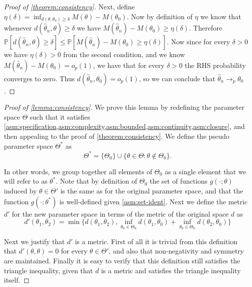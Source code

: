\documentclass{article}
\theoremstyle{plain}
\theoremstyle{definition}
\begin{document}
\begin{proof}[Proof of \cref{theorem:consistency}]
Next, define $\eta(\delta) = \inf_{d(\theta,\theta_0) \geq \delta} M(\theta) - M(\theta_0)$. Now by definition of $\eta$ we know that whenever $d(\hat \theta_n, \theta) \geq \delta$ we have $M(\hat \theta_n) - M(\theta_0) \geq \eta(\delta)$.  Therefore $\mathbb P[d(\hat \theta_n, \theta) \geq \delta] \leq \mathbb P[M(\hat \theta_n) - M(\theta_0) \geq \eta(\delta)]$. Now since for every $\delta > 0$ we have $\eta(\delta) > 0$ from the second condition, and we know $M(\hat \theta_n) - M(\theta_0) = o_p(1)$, we have that for every $\delta > 0$ the RHS probability converges to zero. Thus $d(\hat \theta_n, \theta_0) = o_p(1)$, so we can conclude that $\hat\theta_n \rightarrow_p \theta_0$.
%
%
\end{proof}


\begin{proof}[Proof of \cref{lemma:consistency}]

We prove this lemma by redefining the parameter space $\Theta$ such that it satisfies \cref{asm:specification,asm:complexity,asm:bounded,asm:continuity,asm:closure}, and then appealing to the proof of \cref{theorem:consistency}. We define the pseudo parameter space $\Theta^*$ as
\begin{equation*}
    \Theta^* = \{\Theta_0\} \cup \{\theta \in \Theta : \theta \notin \Theta_0\}.
\end{equation*}

In other words, we group together all elements of $\Theta_0$ as a single element that we will refer to as $\theta^*$. Note that by definition of $\Theta_0$ the set of functions $g(\cdot;\theta)$ induced by $\theta \in \Theta'$ is the same as for the original parameter space, and that the function $g(\cdot;\theta^*)$ is well-defined given \cref{asm:set-ident}. Next we define the metric $d'$ for the new parameter space in terms of the metric of the original space $d$ as
\begin{equation*}
    d'(\theta_1, \theta_2) = \min \{ d(\theta_1, \theta_2), \inf_{\theta_0 \in \Theta_0} d(\theta_1, \theta_0) + \inf_{\theta_0 \in \Theta_0} d(\theta_2, \theta_0) \}
\end{equation*}

Next we justify that $d'$ is a metric. First of all it is trivial from this definition that $d'(\theta,\theta) = 0$ for every $\theta \in \Theta'$, and also that non-negativity and symmetry are maintained. Finally it is easy to verify that this definition still satisfies the triangle inequality, given that $d$ is a metric and satisfies the triangle inequality itself.


\end{proof}
\end{document}
